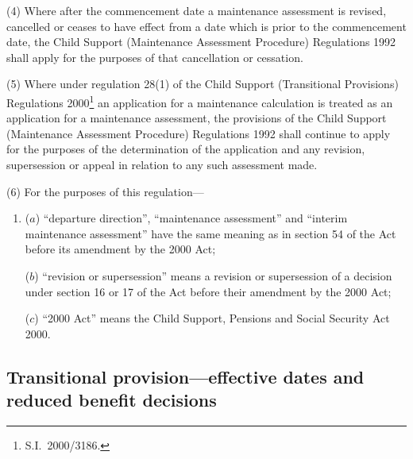 \documentclass[12pt,a4paper]{article}
\begin{document}
(4) Where after the commencement date a maintenance assessment is revised, cancelled or ceases to have effect from a date which is prior to the commencement date, the Child Support (Maintenance Assessment Procedure) Regulations 1992 shall apply for the purposes of that cancellation or cessation.

(5) Where under regulation 28(1) of the Child Support (Transitional Provisions) Regulations 2000\footnote{S.I.\ 2000/3186.} an application for a maintenance calculation is treated as an application for a maintenance assessment, the provisions of the Child Support (Maintenance Assessment Procedure) Regulations 1992 shall continue to apply for the purposes of the determination of the application and any revision, supersession or appeal in relation to any such assessment made.

(6) For the purposes of this regulation—
\begin{enumerate}\item[]
($a$) “departure direction”, “maintenance assessment” and “interim maintenance assessment” have the same meaning as in section 54 of the Act before its amendment by the 2000 Act;

($b$) “revision or supersession” means a revision or supersession of a decision under section 16 or 17 of the Act before their amendment by the 2000 Act;

($c$) “2000 Act” means the Child Support, Pensions and Social Security Act 2000.
\end{enumerate}


\subsection[31. Transitional provision—effective dates and reduced benefit decisions]{Transitional provision—effective dates and reduced benefit decisions}
\end{document}
